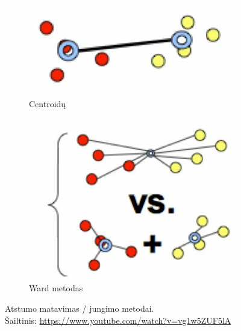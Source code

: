 \documentclass{VUMIFInfKursinis}
\begin{document}
\begin{figure}[H]
\begin{subfigure}[b]{.3\textwidth}
    \includegraphics[scale=1]{img/centroid}
    \centering
    \caption{Centroidų}
  \end{subfigure}
  \begin{subfigure}[b]{.3\textwidth}
    \includegraphics[scale=1]{img/ward}
    \centering
    \caption{Ward metodas}
  \end{subfigure}
  \caption{Atstumo matavimas / jungimo metodai.\\
  		     Šailtinis: \url{https://www.youtube.com/watch?v=vg1w5ZUF5lA}}
\end{figure}

\end{document}
